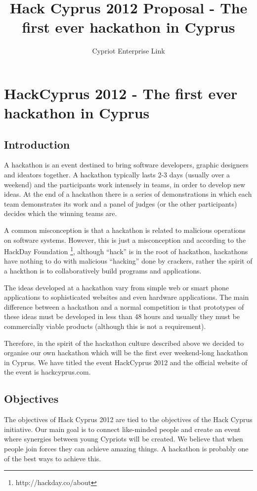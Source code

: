 \documentclass[a4paper,11pt]{report}
\title{Hack Cyprus 2012 Proposal - The first ever hackathon in Cyprus}
\author{Cypriot Enterprise Link}
\begin{document}
\maketitle
\tableofcontents
\chapter{HackCyprus 2012 - The first ever hackathon in Cyprus}
\section{Introduction}
A hackathon is an event destined to bring software developers, graphic designers and ideators together. A hackathon typically lasts 2-3 days (usually over a weekend) and the participants work intensely in teams, in order to develop new ideas. At the end of a hackathon there is a series of demonstrations in which each team demonstrates its work and a panel of judges (or the other participants) decides which the winning teams are.

A common misconception is that a hackathon is related to malicious operations on software systems. However, this is just a misconception and according to the HackDay Foundation \footnote{http://hackday.co/about}, although “hack” is in the root of hackathon, hackathons have nothing to do with malicious “hacking” done by crackers, rather the spirit of a hackthon is to collaboratively build programs and applications.

The ideas developed at a hackathon vary from simple web or smart phone applications to sophisticated websites and even hardware applications. The main difference between a hackathon and a normal competition is that prototypes of these ideas must be developed in less than 48 hours and usually they must be commercially viable products (although this is not a requirement).  

Therefore, in the spirit of the hackathon culture described above we decided to organise our own hackathon which will be the first ever weekend-long hackathon in Cyprus. We have titled the event HackCyprus 2012 and the official website of the event is hackcyprus.com.

\section{Objectives}
The objectives of Hack Cyprus 2012 are tied to the objectives of the Hack Cyprus initiative. Our main goal is to connect like-minded people and create an event where synergies between young Cypriots will be created. We believe that when people join forces they can achieve amazing things. A hackathon is probably one of the best ways to achieve this. 
\end{document}
